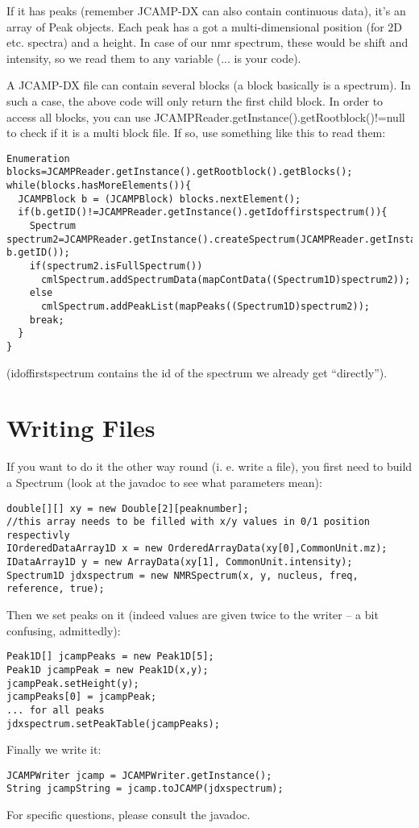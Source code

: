 \documentclass[a4paper]{book}
\begin{document}
If it has peaks (remember JCAMP-DX can also contain continuous data), it's an array of Peak objects. Each peak has a got a multi-dimensional position (for 2D etc. spectra) and a height. In case of our nmr spectrum, these would be shift and intensity, so we read them to any variable (... is your code).

A JCAMP-DX file can contain several blocks (a block basically is a spectrum). In such a case, the above code will only return the first child block. In order to access all blocks, you can use JCAMPReader.getInstance().getRootblock()!=null to check if it is a multi block file. If so, use something like this to read them:

\begin{verbatim}
Enumeration blocks=JCAMPReader.getInstance().getRootblock().getBlocks();
while(blocks.hasMoreElements()){
  JCAMPBlock b = (JCAMPBlock) blocks.nextElement();
  if(b.getID()!=JCAMPReader.getInstance().getIdoffirstspectrum()){
    Spectrum spectrum2=JCAMPReader.getInstance().createSpectrum(JCAMPReader.getInstance().rootblock, b.getID());
    if(spectrum2.isFullSpectrum())
      cmlSpectrum.addSpectrumData(mapContData((Spectrum1D)spectrum2));
    else
      cmlSpectrum.addPeakList(mapPeaks((Spectrum1D)spectrum2));
    break;
  }
}
\end{verbatim}

(idoffirstspectrum contains the id of the spectrum we already get ``directly'').

\section{Writing Files}

If you want to do it the other way round (i. e. write a file), you first need to build a Spectrum (look at the javadoc to see what parameters mean):

\begin{verbatim}
double[][] xy = new Double[2][peaknumber];
//this array needs to be filled with x/y values in 0/1 position respectivly
IOrderedDataArray1D x = new OrderedArrayData(xy[0],CommonUnit.mz);
IDataArray1D y = new ArrayData(xy[1], CommonUnit.intensity);
Spectrum1D jdxspectrum = new NMRSpectrum(x, y, nucleus, freq, reference, true);
\end{verbatim}

Then we set peaks on it (indeed values are given twice to the writer – a bit confusing, admittedly):

\begin{verbatim}
Peak1D[] jcampPeaks = new Peak1D[5];
Peak1D jcampPeak = new Peak1D(x,y);
jcampPeak.setHeight(y);
jcampPeaks[0] = jcampPeak;
... for all peaks
jdxspectrum.setPeakTable(jcampPeaks);
\end{verbatim}

Finally we write it:

\begin{verbatim}
JCAMPWriter jcamp = JCAMPWriter.getInstance();
String jcampString = jcamp.toJCAMP(jdxspectrum);
\end{verbatim}

For specific questions, please consult the javadoc.
\end{document}
